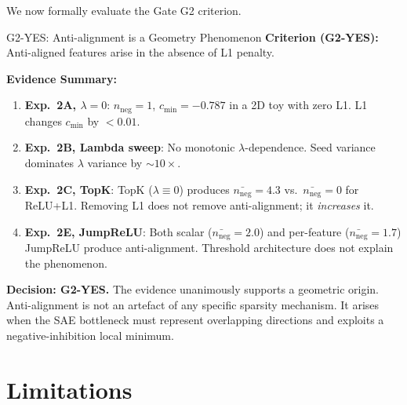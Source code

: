 \documentclass[11pt,a4paper]{article}
\newcommand{\nneg}{n_{\mathrm{neg}}}
\begin{document}
We now formally evaluate the Gate G2 criterion.

\begin{gatedecision}{G2-YES: Anti-alignment is a Geometry Phenomenon}
\textbf{Criterion (G2-YES):} Anti-aligned features arise in the absence of L1 penalty.

\medskip
\textbf{Evidence Summary:}
\begin{enumerate}[noitemsep]
  \item \textbf{Exp.~2A, $\lambda=0$}: $\nneg=1$, $c_\mathrm{min}=-0.787$ in a 2D toy
        with zero L1.  L1 changes $c_\mathrm{min}$ by $<0.01$.
  \item \textbf{Exp.~2B, Lambda sweep}: No monotonic $\lambda$-dependence.  Seed
        variance dominates $\lambda$ variance by $\sim\!10\times$.
  \item \textbf{Exp.~2C, TopK}: TopK ($\lambda\equiv 0$) produces $\bar{\nneg}=4.3$
        vs.\ $\bar{\nneg}=0$ for ReLU+L1.  Removing L1 does not remove anti-alignment;
        it \emph{increases} it.
  \item \textbf{Exp.~2E, JumpReLU}: Both scalar ($\bar{\nneg}=2.0$) and per-feature
        ($\bar{\nneg}=1.7$) JumpReLU produce anti-alignment.  Threshold architecture
        does not explain the phenomenon.
\end{enumerate}

\medskip
\textbf{Decision: G2-YES.}  The evidence unanimously supports a geometric origin.
Anti-alignment is not an artefact of any specific sparsity mechanism.  It arises when
the SAE bottleneck must represent overlapping directions and exploits a
negative-inhibition local minimum.
\end{gatedecision}

\section{Limitations}
\label{sec:limitations}
\end{document}
